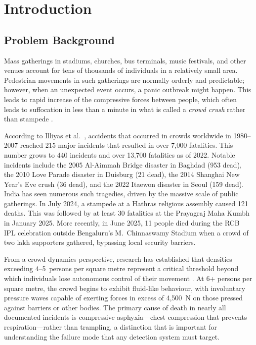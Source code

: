 \section{Introduction}

\subsection{Problem Background}

Mass gatherings in stadiums, churches, bus terminals, music festivals, and other venues account for tens of thousands of individuals in a relatively small area. Pedestrian movements in such gatherings are normally orderly and predictable; however, when an unexpected event occurs, a panic outbreak might happen. This leads to rapid increase of the compressive forces between people, which often leads to suffocation in less than a minute in what is called a \textit{crowd crush} rather than stampede \cite{helbing2007dynamics}.

According to Illiyas et al.\ \cite{illiyas2013human}, accidents that occurred in crowds worldwide in 1980--2007 reached 215 major incidents that resulted in over 7{,}000 fatalities. This number grows to 440 incidents and over 13{,}700 fatalities as of 2022. Notable incidents include the 2005 Al-Aimmah Bridge disaster in Baghdad (953 dead), the 2010 Love Parade disaster in Duisburg (21 dead), the 2014 Shanghai New Year's Eve crush (36 dead), and the 2022 Itaewon disaster in Seoul (159 dead). India has seen numerous such tragedies, driven by the massive scale of public gatherings. In July 2024, a stampede at a Hathras religious assembly caused 121 deaths. This was followed by at least 30 fatalities at the Prayagraj Maha Kumbh in January 2025. More recently, in June 2025, 11 people died during the RCB IPL celebration outside Bengaluru's M.\ Chinnaswamy Stadium when a crowd of two lakh supporters gathered, bypassing local security barriers.

From a crowd-dynamics perspective, research has established that densities exceeding 4--5~persons per square metre represent a critical threshold beyond which individuals lose autonomous control of their movement \cite{helbing2007dynamics}. At 6+ persons per square metre, the crowd begins to exhibit fluid-like behaviour, with involuntary pressure waves capable of exerting forces in excess of 4{,}500~N on those pressed against barriers or other bodies. The primary cause of death in nearly all documented incidents is compressive asphyxia---chest compression that prevents respiration---rather than trampling, a distinction that is important for understanding the failure mode that any detection system must target.

